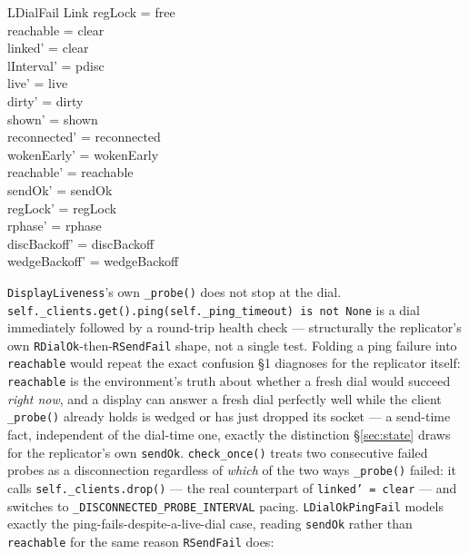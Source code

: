 \documentclass[a4paper,10pt,fleqn]{article}
\begin{document}
\begin{schema}{LDialFail}
  \Delta Link
\where
  regLock = free \\
  reachable = clear \\
  linked' = clear \\
  lInterval' = pdisc \\
  live' = live \\ dirty' = dirty \\ shown' = shown \\
  reconnected' = reconnected \\ wokenEarly' = wokenEarly \\
  reachable' = reachable \\ sendOk' = sendOk \\ regLock' = regLock \\
  rphase' = rphase \\
  discBackoff' = discBackoff \\ wedgeBackoff' = wedgeBackoff
\end{schema}

\texttt{DisplayLiveness}'s own \texttt{\_probe()} does not stop at the
dial.  \texttt{self.\_clients.get().ping(self.\_ping\_timeout) is not
None} is a dial immediately followed by a round-trip health check ---
structurally the replicator's own \texttt{RDialOk}-then-\texttt{RSendFail}
shape, not a single test.  Folding a ping failure into \texttt{reachable}
would repeat the exact confusion \S1 diagnoses for the replicator itself:
\texttt{reachable} is the environment's truth about whether a fresh dial
would succeed \emph{right now}, and a display can answer a fresh dial
perfectly well while the client \texttt{\_probe()} already holds is
wedged or has just dropped its socket --- a send-time fact, independent
of the dial-time one, exactly the distinction \S\ref{sec:state} draws for
the replicator's own \texttt{sendOk}.  \texttt{check\_once()} treats two
consecutive failed probes as a disconnection regardless of \emph{which}
of the two ways \texttt{\_probe()} failed: it calls
\texttt{self.\_clients.drop()} --- the real counterpart of
\texttt{linked' = clear} --- and switches to
\texttt{\_DISCONNECTED\_PROBE\_INTERVAL} pacing.
\texttt{LDialOkPingFail} models exactly the ping-fails-despite-a-live-dial
case, reading \texttt{sendOk} rather than \texttt{reachable} for the same
reason \texttt{RSendFail} does:
\end{document}
